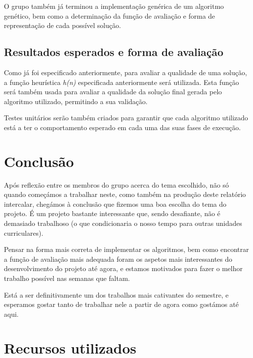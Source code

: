 \documentclass[11pt,a4paper,reqno]{article}
\numberwithin{equation}{section}
\begin{document}
O grupo também já terminou a implementação genérica de um algoritmo genético, bem como a determinação da função de avaliação e forma de representação de cada possível solução.

\subsection{Resultados esperados e forma de avaliação}
Como já foi especificado anteriormente, para avaliar a qualidade de uma solução, a função heurística \textit{h(n)} especificada anteriormente será utilizada. Esta função será também usada para avaliar a qualidade da solução final gerada pelo algoritmo utilizado, permitindo a sua validação.

Testes unitários serão também criados para garantir que cada algoritmo utilizado está a ter o comportamento esperado em cada uma das suas fases de execução.



\newpage

\section{Conclusão}
Após reflexão entre os membros do grupo acerca do tema escolhido, não só quando começámos a trabalhar neste, como também na produção deste relatório intercalar, chegámos à conclusão que fizemos uma boa escolha do tema do projeto. É um projeto bastante interessante que, sendo desafiante, não é demasiado trabalhoso (o que condicionaria o nosso tempo para outras unidades curriculares).

Pensar na forma mais correta de implementar os algoritmos, bem como encontrar a função de avaliação mais adequada foram os aspetos mais interessantes do desenvolvimento do projeto até agora, e estamos motivados para fazer o melhor trabalho possível nas semanas que faltam.

Está a ser definitivamente um dos trabalhos mais cativantes do semestre, e esperamos gostar tanto de trabalhar nele a partir de agora como gostámos até aqui.


\newpage

\section{Recursos utilizados}
\end{document}
